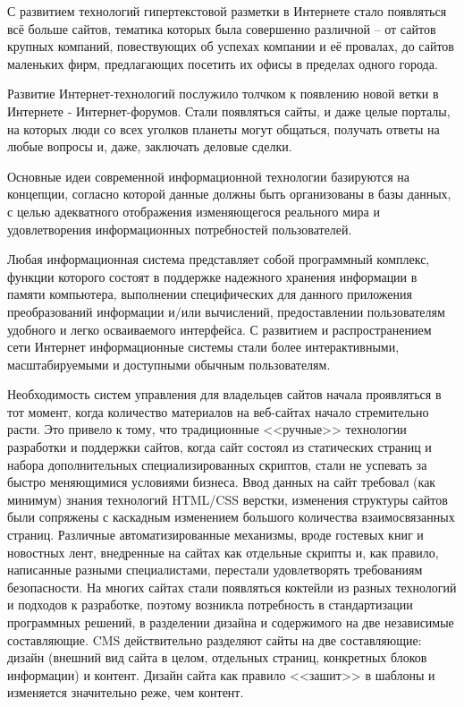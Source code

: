 С развитием технологий гипертекстовой разметки в Интернете стало появляться всё больше сайтов, тематика которых была совершенно различной – от сайтов крупных компаний, повествующих об успехах компании и её провалах, до сайтов маленьких фирм, предлагающих посетить их офисы в пределах одного города.

Развитие Интернет-технологий послужило толчком к появлению новой ветки в Интернете - Интернет-форумов. Стали появляться сайты, и даже целые порталы, на которых люди со всех уголков планеты могут общаться, получать ответы на любые вопросы и, даже, заключать деловые сделки.

Основные идеи современной информационной технологии базируются на концепции, согласно которой данные должны быть организованы в базы данных, с целью адекватного отображения изменяющегося реального мира и удовлетворения информационных потребностей пользователей.

Любая информационная система представляет собой программный комплекс, функции которого состоят в поддержке надежного хранения информации в памяти компьютера, выполнении специфических для данного приложения преобразований информации и/или вычислений, предоставлении пользователям удобного и легко осваиваемого интерфейса. С развитием и распространением сети Интернет информационные системы стали более интерактивными, масштабируемыми и доступными обычным пользователям.

Необходимость систем управления для владельцев сайтов начала проявляться в тот момент, когда количество материалов на веб-сайтах начало стремительно расти. Это привело к тому, что традиционные <<ручные>> технологии разработки и поддержки сайтов, когда сайт состоял из статических страниц и набора дополнительных специализированных скриптов, стали не успевать за быстро меняющимися условиями бизнеса. Ввод данных на сайт требовал (как минимум) знания технологий HTML/CSS верстки, изменения структуры сайтов были сопряжены с каскадным изменением большого количества взаимосвязанных страниц. Различные автоматизированные механизмы, вроде гостевых книг и новостных лент, внедренные на сайтах как отдельные скрипты и, как правило, написанные разными специалистами, перестали удовлетворять требованиям безопасности. На многих сайтах стали появляться коктейли из разных технологий и подходов к разработке, поэтому возникла потребность в стандартизации программных решений, в разделении дизайна и содержимого на две независимые составляющие. CMS действительно разделяют сайты на две составляющие: дизайн (внешний вид сайта в целом, отдельных страниц, конкретных блоков информации) и контент. Дизайн сайта как правило <<зашит>> в шаблоны и изменяется значительно реже, чем контент.

